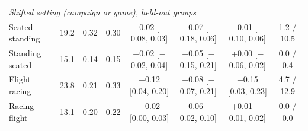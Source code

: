 \begin{table}[t]
\begin{tabular}{@{}lrcccccc@{}}
\multicolumn{8}{l}{\emph{Shifted setting (campaign or game), held-out groups}} \\
Seated \ra{} standing & 19.2 & 0.32 & 0.30 & $-$0.02 [$-$0.08, 0.03] & $-$0.07 [$-$0.18, 0.06] & $-$0.01 [$-$0.10, 0.06] & 1.2 / 10.5 \\
Standing \ra{} seated & 15.1 & 0.14 & 0.15 & +0.02 [$-$0.02, 0.04] & +0.05 [$-$0.15, 0.21] & +0.00 [$-$0.06, 0.02] & 0.0 / 0.4 \\
Flight \ra{} racing & 23.8 & 0.21 & 0.33 & +0.12 [0.04, 0.20] & +0.08 [$-$0.07, 0.21] & +0.15 [0.03, 0.23] & 4.7 / 12.9 \\
Racing \ra{} flight & 13.1 & 0.20 & 0.22 & +0.02 [0.00, 0.03] & +0.06 [$-$0.02, 0.10] & +0.01 [$-$0.01, 0.02] & 0.0 / 0.0 \\
\bottomrule
\end{tabular}
\end{table}